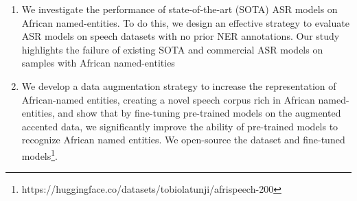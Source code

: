 \documentclass{INTERSPEECH2023}
\begin{document}
    





\begin{enumerate}
    \item We investigate the performance of state-of-the-art (SOTA) ASR models on African named-entities. To do this, we design an effective strategy to evaluate ASR models on speech datasets with no prior NER annotations. Our study highlights the failure of existing SOTA and commercial ASR models on samples with African named-entities
    \item We develop a data augmentation strategy to increase the representation of African-named entities, creating a novel speech corpus rich in African named-entities, and show that by fine-tuning pre-trained models on the augmented accented data, we significantly improve the ability of pre-trained models to recognize African named entities. We open-source the dataset and fine-tuned models\footnote{https://huggingface.co/datasets/tobiolatunji/afrispeech-200}.
    
\end{enumerate}



    
\end{document}
